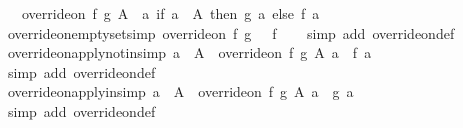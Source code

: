 \begin{isabellebody}
\ \ \ {\isachardoublequoteopen}override{\isacharunderscore}{\kern0pt}on\ f\ g\ A\ {\isacharequal}{\kern0pt}\ {\isacharparenleft}{\kern0pt}{\isasymlambda}a{\isachardot}{\kern0pt}\ if\ a\ {\isasymin}\ A\ then\ g\ a\ else\ f\ a{\isacharparenright}{\kern0pt}{\isachardoublequoteclose}\isanewline
\isanewline
{}\isamarkupfalse%
\ override{\isacharunderscore}{\kern0pt}on{\isacharunderscore}{\kern0pt}emptyset{\isacharbrackleft}{\kern0pt}simp{\isacharbrackright}{\kern0pt}{\isacharcolon}{\kern0pt}\ {\isachardoublequoteopen}override{\isacharunderscore}{\kern0pt}on\ f\ g\ {\isacharbraceleft}{\kern0pt}{\isacharbraceright}{\kern0pt}\ {\isacharequal}{\kern0pt}\ f{\isachardoublequoteclose}\isanewline
%
\isadelimproof
\ \ %
\endisadelimproof
%
\isatagproof
{}\isamarkupfalse%
\ {\isacharparenleft}{\kern0pt}simp\ add{\isacharcolon}{\kern0pt}\ override{\isacharunderscore}{\kern0pt}on{\isacharunderscore}{\kern0pt}def{\isacharparenright}{\kern0pt}%
\endisatagproof
{\isafoldproof}%
%
\isadelimproof
\isanewline
%
\endisadelimproof
\isanewline
{}\isamarkupfalse%
\ override{\isacharunderscore}{\kern0pt}on{\isacharunderscore}{\kern0pt}apply{\isacharunderscore}{\kern0pt}notin{\isacharbrackleft}{\kern0pt}simp{\isacharbrackright}{\kern0pt}{\isacharcolon}{\kern0pt}\ {\isachardoublequoteopen}a\ {\isasymnotin}\ A\ {\isasymLongrightarrow}\ {\isacharparenleft}{\kern0pt}override{\isacharunderscore}{\kern0pt}on\ f\ g\ A{\isacharparenright}{\kern0pt}\ a\ {\isacharequal}{\kern0pt}\ f\ a{\isachardoublequoteclose}\isanewline
%
\isadelimproof
\ \ %
\endisadelimproof
%
\isatagproof
{}\isamarkupfalse%
\ {\isacharparenleft}{\kern0pt}simp\ add{\isacharcolon}{\kern0pt}\ override{\isacharunderscore}{\kern0pt}on{\isacharunderscore}{\kern0pt}def{\isacharparenright}{\kern0pt}%
\endisatagproof
{\isafoldproof}%
%
\isadelimproof
\isanewline
%
\endisadelimproof
\isanewline
{}\isamarkupfalse%
\ override{\isacharunderscore}{\kern0pt}on{\isacharunderscore}{\kern0pt}apply{\isacharunderscore}{\kern0pt}in{\isacharbrackleft}{\kern0pt}simp{\isacharbrackright}{\kern0pt}{\isacharcolon}{\kern0pt}\ {\isachardoublequoteopen}a\ {\isasymin}\ A\ {\isasymLongrightarrow}\ {\isacharparenleft}{\kern0pt}override{\isacharunderscore}{\kern0pt}on\ f\ g\ A{\isacharparenright}{\kern0pt}\ a\ {\isacharequal}{\kern0pt}\ g\ a{\isachardoublequoteclose}\isanewline
%
\isadelimproof
\ \ %
\endisadelimproof
%
\isatagproof
{}\isamarkupfalse%
\ {\isacharparenleft}{\kern0pt}simp\ add{\isacharcolon}{\kern0pt}\ override{\isacharunderscore}{\kern0pt}on{\isacharunderscore}{\kern0pt}def{\isacharparenright}{\kern0pt}%

\end{isabellebody}
